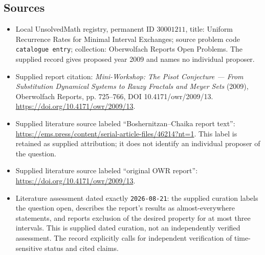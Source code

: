 \documentclass[11pt]{article}
\begin{document}
\subsection{Sources}
\begin{itemize}
\item Local UnsolvedMath registry, permanent ID \(30001211\), title: Uniform Recurrence Rates for Minimal Interval Exchanges; source problem code \texttt{catalogue entry}; collection: Oberwolfach Reports Open Problems. The supplied record gives proposed year 2009 and names no individual proposer.
\item Supplied report citation: \emph{Mini-Workshop: The Pisot Conjecture --- From Substitution Dynamical Systems to Rauzy Fractals and Meyer Sets} (2009), Oberwolfach Reports, pp. 725--766, DOI 10.4171/owr/2009/13. \url{https://doi.org/10.4171/owr/2009/13}.
\item Supplied literature source labeled ``Boshernitzan--Chaika report text'': \url{https://ems.press/content/serial-article-files/46214?nt=1}. This label is retained as supplied attribution; it does not identify an individual proposer of the question.
\item Supplied literature source labeled ``original OWR report'': \url{https://doi.org/10.4171/owr/2009/13}.
\item Literature assessment dated exactly \texttt{2026-08-21}: the supplied curation labels the question open, describes the report's results as almost-everywhere statements, and reports exclusion of the desired property for at most three intervals. This is supplied dated curation, not an independently verified assessment. The record explicitly calls for independent verification of time-sensitive status and cited claims.
\end{itemize}
\end{document}
